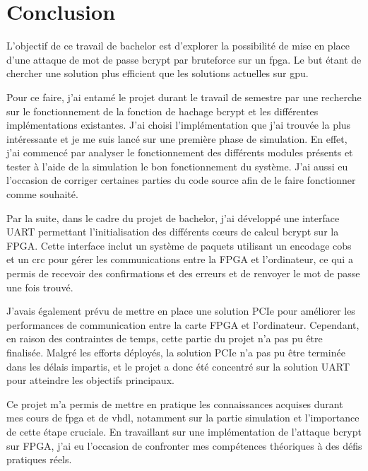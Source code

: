 \chapter*{Conclusion}


L'objectif de ce travail de bachelor est d'explorer la possibilité de mise en place d'une attaque de mot de passe bcrypt par bruteforce sur un \gls{fpga}.
Le but étant de chercher une solution plus efficient que les solutions actuelles sur \gls{gpu}. 

Pour ce faire, j'ai entamé le projet durant le travail de semestre par une recherche sur le fonctionnement de la fonction de hachage bcrypt et les différentes implémentations existantes.
J'ai choisi l'implémentation que j'ai trouvée la plus intéressante et je me suis lancé sur une première phase de simulation.
En effet, j'ai commencé par analyser le fonctionnement des différents modules présents et tester à l'aide de la simulation le bon fonctionnement du système.
J'ai aussi eu l'occasion de corriger certaines parties du code source afin de le faire fonctionner comme souhaité. 

Par la suite, dans le cadre du projet de bachelor, j'ai développé une interface UART permettant l'initialisation des différents cœurs de calcul bcrypt sur la FPGA. 
Cette interface inclut un système de paquets utilisant un encodage \gls{cobs} et un \gls{crc} pour gérer les communications entre la FPGA et l'ordinateur, ce qui a permis de recevoir des confirmations et des erreurs et de renvoyer le mot de passe une fois trouvé.

J'avais également prévu de mettre en place une solution PCIe pour améliorer les performances de communication entre la carte FPGA et l'ordinateur. 
Cependant, en raison des contraintes de temps, cette partie du projet n'a pas pu être finalisée. 
Malgré les efforts déployés, la solution PCIe n'a pas pu être terminée dans les délais impartis, et le projet a donc été concentré sur la solution UART pour atteindre les objectifs principaux.


Ce projet m'a permis de mettre en pratique les connaissances acquises durant mes cours de \gls{fpga} et de \gls{vhdl}, notamment sur la partie simulation et l'importance de cette étape cruciale. 
En travaillant sur une implémentation de l'attaque bcrypt sur FPGA, j'ai eu l'occasion de confronter mes compétences théoriques à des défis pratiques réels.

